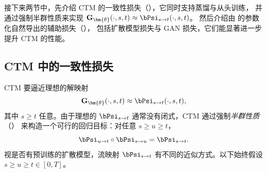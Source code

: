 接下来两节中，先介绍 CTM 的一致性损失（），它同时支持蒸馏与从头训练，
并通过强制半群性质来实现 $\mathbf{G}_{\bm{\theta}}(\cdot, s, t) \approx \bPsi_{s\to t}(\cdot, s, t)$。
然后介绍由  的参数化自然导出的辅助损失（），
包括扩散模型损失与 GAN 损失，它们能显著进一步提升 CTM 的性能。


\subsection{CTM 中的一致性损失}\label{subsec:ctm-consistency}
CTM 要逼近理想的解映射
\[
\mathbf{G}_{\bm{\theta}}(\cdot, s, t) \approx \bPsi_{s\to t}(\cdot, s, t),
\]
其中 $s \ge t$ 任意。由于理想的 $\bPsi_{s\to t}$ 通常没有闭式，CTM 通过强制\emph{半群性质}（）
来构造一个可行的回归目标：对任意 $s \ge u \ge t$，
\[
\bPsi_{u\to t}\circ \bPsi_{s\to u} = \bPsi_{s\to t}.
\]
视是否有预训练的扩散模型，流映射 $\bPsi_{s\to t}$ 有不同的近似方式。以下始终假设 $s \ge u \ge t \in [0,T]$。


